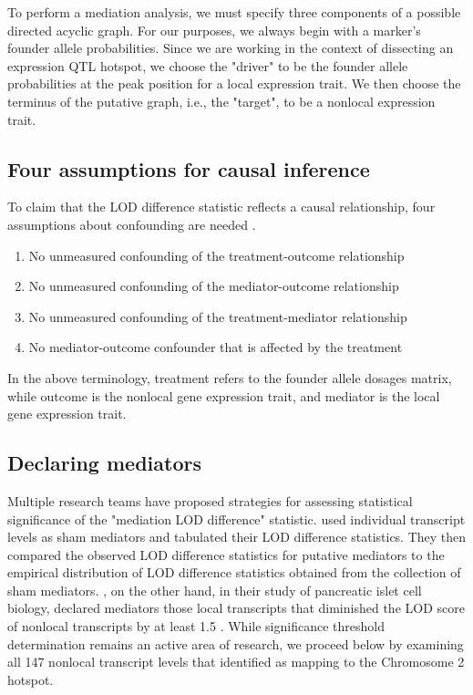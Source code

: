 \documentclass{article}
\begin{document}
\begin{boehm}
To perform a mediation analysis, we must specify three components of a possible directed acyclic graph. For our purposes, we always begin with a marker's founder allele probabilities. Since we are working in the context of dissecting an expression QTL hotspot, we choose the "driver" to be the founder allele probabilities at the peak position for a local expression trait. We then choose the terminus of the putative graph, i.e., the "target", to be a nonlocal expression trait.






\subsection{Four assumptions for causal inference}

To claim that the LOD difference statistic reflects a causal relationship, four assumptions about confounding are needed \citep{vanderweele2015explanation}.


\begin{mdframed}
\begin{enumerate}
\item No unmeasured confounding of the treatment-outcome relationship
\item No unmeasured confounding of the mediator-outcome relationship
\item No unmeasured confounding of the treatment-mediator relationship
\item No mediator-outcome confounder that is affected by the treatment
\label{list4}
\end{enumerate}
\end{mdframed}


In the above terminology, treatment refers to the founder allele dosages matrix, while outcome is the nonlocal gene expression trait, and mediator is the local gene expression trait.





\subsection{Declaring mediators}

Multiple research teams have proposed strategies for assessing statistical significance of the "mediation LOD difference" statistic. \citet{chick2016defining} used individual transcript levels as sham mediators and tabulated their LOD difference statistics. They then compared the observed LOD difference statistics for putative mediators to the empirical distribution of LOD difference statistics obtained from the collection of sham mediators. \citet{keller2018genetic}, on the other hand, in their study of pancreatic islet cell biology, declared mediators those local transcripts that diminished the LOD score of nonlocal transcripts by at least 1.5 \citep{keller2018genetic}. While significance threshold determination remains an active area of research, we proceed below by examining all 147 nonlocal transcript levels that \citet{keller2018genetic} identified as mapping to the Chromosome 2 hotspot.




\end{boehm}
\end{document}
